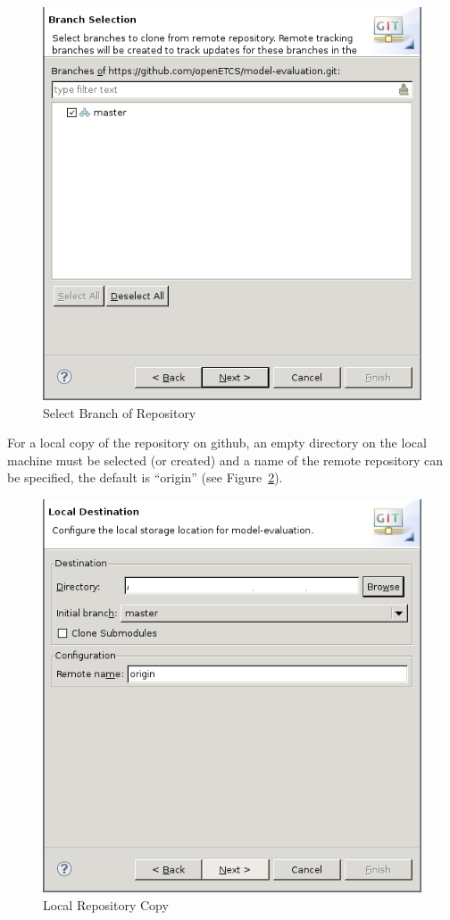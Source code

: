 \documentclass[10pt,a4paper]{article}
\newcommand{\skalierung}{.6}
\begin{document}
\begin{figure}[H]
  \centering
  \includegraphics[width=\skalierung\textwidth]{project_import_step4}
  \caption{Select Branch of Repository}
  \label{fig:select-branch}
\end{figure}

For a local copy of the repository on github, an empty directory on the local
machine must be selected (or created) and a name of the remote repository can be
specified, the default is ``origin'' (see Figure~\ref{fig:local-copy}).

\begin{figure}[H]
  \centering
  \includegraphics[width=\skalierung\textwidth]{project_import_step5}
  \caption{Local Repository Copy}
  \label{fig:local-copy}
\end{figure}
\end{document}
